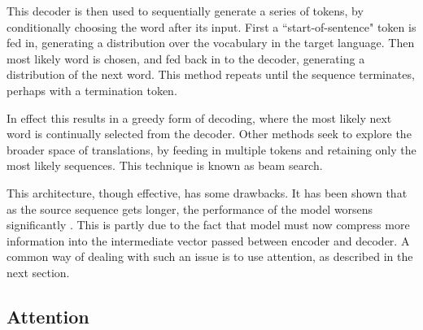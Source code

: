 This decoder is then used to sequentially generate a series of tokens, by conditionally choosing the word after its input. First a ``start-of-sentence" token is fed in, generating a distribution over the vocabulary in the target language. Then most likely word is chosen, and fed back in to the decoder, generating a distribution of the next word. This method repeats until the sequence terminates, perhaps with a termination token.

In effect this results in a greedy form of decoding, where the most likely next word is continually selected from the decoder.  Other methods seek to explore the broader space of translations, by feeding in multiple tokens and retaining only the most likely sequences. This technique is known as beam search.

This architecture, though effective, has some drawbacks. It has been shown that as the source sequence gets longer, the performance of the model worsens significantly \cite{cho_properties_2014}. This is partly due to the fact that model must now compress more information into the intermediate vector passed between encoder and decoder. A common way of dealing with such an issue is to use attention, as described in the next section. 




\subsection{Attention} %


